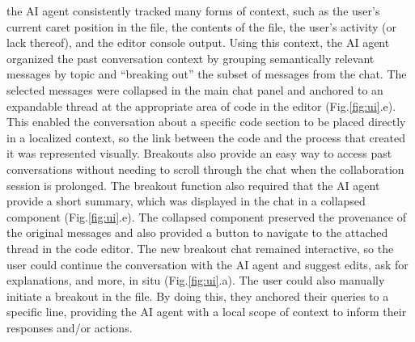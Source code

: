  the AI agent consistently tracked many forms of context, such as the user’s current caret position in the file, the contents of the file, the user’s activity (or lack thereof), and the editor console output. 
Using this context, the AI agent organized the past conversation context by grouping semantically relevant messages by topic and “breaking out” the subset of messages from the chat. 
The selected messages were collapsed in the main chat panel and anchored to an expandable thread at the appropriate area of code in the editor (Fig.\ref{fig:ui}.e). 
This enabled the conversation about a specific code section to be placed directly in a localized context, so the link between the code and the process that created it was represented visually. 
Breakouts also provide an easy way to access past conversations without needing to scroll through the chat when the collaboration session is prolonged. 
The breakout function also required that the AI agent provide a short summary, which was displayed in the chat in a collapsed component (Fig.\ref{fig:ui}.e). The collapsed component preserved the provenance of the original messages and also provided a button to navigate to the attached thread in the code editor. 
The new breakout chat remained interactive, so the user could continue the conversation with the AI agent and suggest edits, ask for explanations, and more, in situ (Fig.\ref{fig:ui}.a). 
The user could also manually initiate a breakout in the file. By doing this, they anchored their queries to a specific line, providing the AI agent with a local scope of context to inform their responses and/or actions.

